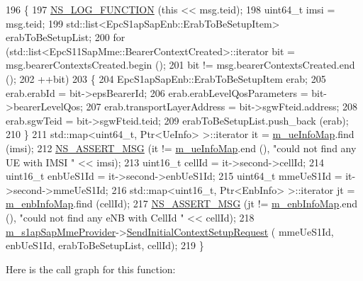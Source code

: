\begin{DoxyCode}
196 \{
197   \hyperlink{log-macros-disabled_8h_a90b90d5bad1f39cb1b64923ea94c0761}{NS\_LOG\_FUNCTION} (\textcolor{keyword}{this} << msg.teid);
198   uint64\_t imsi = msg.teid;
199   std::list<EpcS1apSapEnb::ErabToBeSetupItem> erabToBeSetupList;
200   \textcolor{keywordflow}{for} (std::list<EpcS11SapMme::BearerContextCreated>::iterator bit = msg.bearerContextsCreated.begin ();
201        bit != msg.bearerContextsCreated.end ();
202        ++bit)
203     \{
204       EpcS1apSapEnb::ErabToBeSetupItem erab;
205       erab.erabId = bit->epsBearerId;
206       erab.erabLevelQosParameters = bit->bearerLevelQos;
207       erab.transportLayerAddress = bit->sgwFteid.address;
208       erab.sgwTeid = bit->sgwFteid.teid;      
209       erabToBeSetupList.push\_back (erab);
210     \}
211   std::map<uint64\_t, Ptr<UeInfo> >::iterator it = \hyperlink{classns3_1_1EpcMmeApplication_a1f33ca8847355e961f6c290dfb6e16e6}{m\_ueInfoMap}.find (imsi);
212   \hyperlink{assert_8h_aff5ece9066c74e681e74999856f08539}{NS\_ASSERT\_MSG} (it != \hyperlink{classns3_1_1EpcMmeApplication_a1f33ca8847355e961f6c290dfb6e16e6}{m\_ueInfoMap}.end (), \textcolor{stringliteral}{"could not find any UE with IMSI "} << 
      imsi);
213   uint16\_t cellId = it->second->cellId;
214   uint16\_t enbUeS1Id = it->second->enbUeS1Id;
215   uint64\_t mmeUeS1Id = it->second->mmeUeS1Id;
216   std::map<uint16\_t, Ptr<EnbInfo> >::iterator jt = \hyperlink{classns3_1_1EpcMmeApplication_a6c49c825306fc4923aef0352a1fab029}{m\_enbInfoMap}.find (cellId);
217   \hyperlink{assert_8h_aff5ece9066c74e681e74999856f08539}{NS\_ASSERT\_MSG} (jt != \hyperlink{classns3_1_1EpcMmeApplication_a6c49c825306fc4923aef0352a1fab029}{m\_enbInfoMap}.end (), \textcolor{stringliteral}{"could not find any eNB with CellId "} 
      << cellId);
218   \hyperlink{classns3_1_1EpcMmeApplication_a22aa4b3242125c65e94ce651970be4c1}{m\_s1apSapMmeProvider}->\hyperlink{classns3_1_1EpcS1apSapMmeProvider_af147967091bda76791089f4db21f9689}{SendInitialContextSetupRequest} (
      mmeUeS1Id, enbUeS1Id, erabToBeSetupList, cellId);
219 \}
\end{DoxyCode}


Here is the call graph for this function\+:


